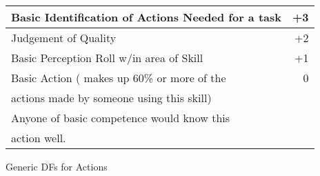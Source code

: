 \begin{SHTable}
	\begin{tabular}{lr}
	Basic Identification of Actions Needed for a task & +3	\\ 
\hline
	Judgement of Quality                          & +2	\\
	Basic Perception Roll w/in area of Skill      & +1	\\
	Basic Action ( makes up 60\% or more of the   & 0	\\  
	actions made by someone using this skill)     &      \\
	Anyone of basic competence would know this   &      \\
	action well.                                  &      \\
	\end{tabular}
    \caption{Generic DFs for Actions}\label{Table:GenericDFs}
\end{SHTable}
